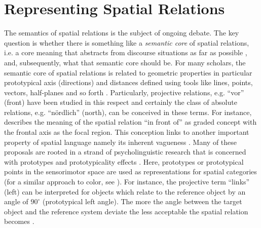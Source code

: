 \section{Representing Spatial Relations}
The semantics of spatial relations is the subject of ongoing debate. The 
key question is whether there is something like a 
\emph{semantic core}  of 
spatial relations, i.e. a core meaning that 
abstracts from discourse situations as far as possible 
\citep{tenbrink2007space}, and, subsequently, what that 
semantic core should be. For many scholars, the semantic core of spatial 
relations is related to geometric 
properties \citep{herskovits1986language,eschenbach1999geometric,tenbrink2007space}
in particular prototypical axis (directions) and distances defined using tools 
like lines, points, vectors, half-planes and so forth \citep{levinson1996language}. 
Particularly, projective relations, e.g. ``vor'' (front) have been studied 
in this respect and certainly the class of absolute relations, e.g. ``n\"ordlich'' 
(north), can be conceived in these terms. For instance, 
\cite{herskovits1986language}  describes the meaning 
of the spatial relation ``in front of'' as graded concept with the frontal 
axis as the focal region. This conception links to another important property
of spatial language namely its inherent vagueness 
\citep{hall2008quantifying}.
Many of these proposals are rooted in a strand of psycholinguistic research that is concerned with
prototypes and prototypicality effects \citep{rosch1978principle}. 
Here, prototypes or prototypical points in the sensorimotor
space are used as representations for spatial categories
(for a similar approach to color, see \citealp{bleys2010phd}). 
For instance, the projective term ``links'' (left) can 
be interpreted for objects which relate to the reference object
by an angle of $90^\circ$ (prototypical left angle). The more the angle 
between the target object and the reference system deviate
the less acceptable the spatial relation becomes \citep{tenbrink2005identifying,herskovits1986language,gapp1995angle}. 

